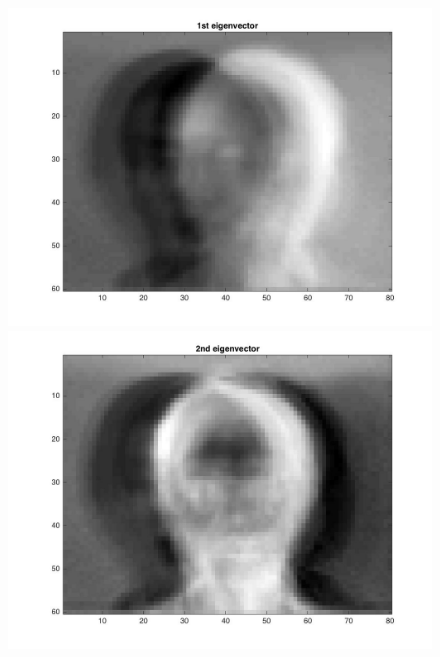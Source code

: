 \documentclass{article}
\begin{document}
\begin{figure}[H]
\includegraphics[scale =.4]{report7_1}
\includegraphics[scale =.4]{report7_2}
\end{figure}
\end{document}
